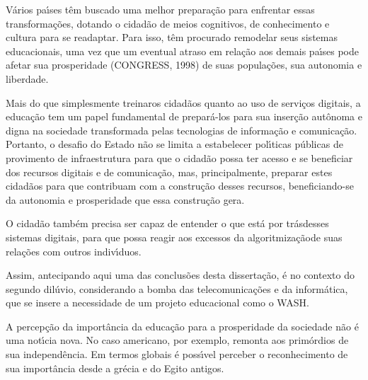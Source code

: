 \documentclass[
12pt,		%
openright,	%
twoside,  %
a4paper,			%
chapter=TITLE,		%
english,			%
french,				%
spanish,			%
brazil				%
]{USPSC-classe/USPSC}
\begin{document}
V\'arios pa\'{\i}ses t\^em buscado uma melhor prepara\c{c}\~ao para enfrentar essas transforma\c{c}\~oes, dotando o cidad\~ao de meios cognitivos, de conhecimento e cultura para se readaptar. Para isso, t\^em procurado remodelar seus sistemas educacionais, uma vez que um eventual atraso em rela\c{c}\~ao aos demais pa\'{\i}ses pode afetar sua prosperidade (CONGRESS, 1998)  de suas popula\c{c}\~oes, sua autonomia e liberdade.










Mais do que simplesmente \textquotedbl treinar\textquotedbl  os cidad\~aos quanto ao uso  de servi\c{c}os digitais, a educa\c{c}\~ao tem um papel fundamental de prepar\'a-los para sua inser\c{c}\~ao aut\^onoma e digna na sociedade transformada pelas tecnologias de informa\c{c}\~ao e comunica\c{c}\~ao. Portanto, o desafio do Estado n\~ao se limita a estabelecer pol\'{\i}ticas p\'ublicas de provimento de infraestrutura para que o cidad\~ao possa ter acesso e se beneficiar dos recursos digitais e de comunica\c{c}\~ao, mas, principalmente, preparar estes cidad\~aos para que contribuam com a  constru\c{c}\~ao desses recursos, beneficiando-se da autonomia e prosperidade que  essa constru\c{c}\~ao gera.










O cidad\~ao tamb\'em precisa ser capaz de entender \textquotedbl o que est\'a por tr\'as\textquotedbl  desses sistemas digitais, para que possa reagir aos excessos da \textquotedbl algoritmiza\c{c}\~ao\textquotedbl  de suas rela\c{c}\~oes com outros indiv\'{\i}duos.










Assim, antecipando aqui uma das conclus\~oes desta disserta\c{c}\~ao, \'e no contexto do \textquotedbl segundo dil\'uvio\textquotedbl , considerando a bomba das telecomunica\c{c}\~oes e da inform\'atica, que se insere a necessidade de um projeto educacional como o WASH.










A percep\c{c}\~ao da import\^ancia da educa\c{c}\~ao para a prosperidade da sociedade n\~ao \'e uma not\'{\i}cia nova. No caso americano, por exemplo, remonta aos prim\'ordios de sua independ\^encia. Em termos globais \'e poss\'{\i}vel perceber o reconhecimento de sua import\^ancia desde a gr\'ecia e do Egito antigos.
\end{document}

